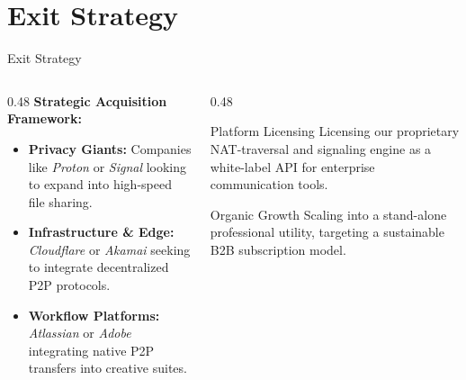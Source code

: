 \documentclass[aspectratio=169]{beamer}
\begin{document}
\section{Exit Strategy}
\begin{frame}{Exit Strategy}
    \begin{columns}[t]
        \begin{column}{0.48\textwidth}
            \small \textbf{Strategic Acquisition Framework:}
            \vspace{0.2cm}
            \begin{itemize}
                \footnotesize
                \item \textbf{Privacy Giants:} Companies like \textit{Proton} or \textit{Signal} looking to expand into high-speed file sharing.
                \item \textbf{Infrastructure \& Edge:} \textit{Cloudflare} or \textit{Akamai} seeking to integrate decentralized P2P protocols.
                \item \textbf{Workflow Platforms:} \textit{Atlassian} or \textit{Adobe} integrating native P2P transfers into creative suites.
            \end{itemize}
        \end{column}

        \begin{column}{0.48\textwidth}
            \begin{block}{Platform Licensing}
                \small Licensing our proprietary NAT-traversal and signaling engine as a white-label API for enterprise communication tools.
            \end{block}
            \vspace{0.2cm}
            \begin{block}{Organic Growth}
                \small Scaling into a stand-alone professional utility, targeting a sustainable B2B subscription model.
            \end{block}
        \end{column}
    \end{columns}
\end{frame}
\end{document}
